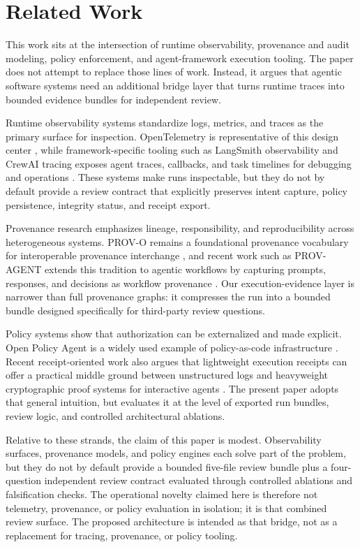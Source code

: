 \section{Related Work}
\label{sec:related-work}

This work sits at the intersection of runtime observability, provenance and audit modeling, policy enforcement, and agent-framework execution tooling. The paper does not attempt to replace those lines of work. Instead, it argues that agentic software systems need an additional bridge layer that turns runtime traces into bounded evidence bundles for independent review.

Runtime observability systems standardize logs, metrics, and traces as the primary surface for inspection. OpenTelemetry is representative of this design center \cite{opentelemetry}, while framework-specific tooling such as LangSmith observability and CrewAI tracing exposes agent traces, callbacks, and task timelines for debugging and operations \cite{langsmith-observability,crewai-tracing}. These systems make runs inspectable, but they do not by default provide a review contract that explicitly preserves intent capture, policy persistence, integrity status, and receipt export.

Provenance research emphasizes lineage, responsibility, and reproducibility across heterogeneous systems. PROV-O remains a foundational provenance vocabulary for interoperable provenance interchange \cite{prov-o}, and recent work such as PROV-AGENT extends this tradition to agentic workflows by capturing prompts, responses, and decisions as workflow provenance \cite{prov-agent}. Our execution-evidence layer is narrower than full provenance graphs: it compresses the run into a bounded bundle designed specifically for third-party review questions.

Policy systems show that authorization can be externalized and made explicit. Open Policy Agent is a widely used example of policy-as-code infrastructure \cite{opa}. Recent receipt-oriented work also argues that lightweight execution receipts can offer a practical middle ground between unstructured logs and heavyweight cryptographic proof systems for interactive agents \cite{tool-receipts}. The present paper adopts that general intuition, but evaluates it at the level of exported run bundles, review logic, and controlled architectural ablations.

Relative to these strands, the claim of this paper is modest. Observability surfaces, provenance models, and policy engines each solve part of the problem, but they do not by default provide a bounded five-file review bundle plus a four-question independent review contract evaluated through controlled ablations and falsification checks. The operational novelty claimed here is therefore not telemetry, provenance, or policy evaluation in isolation; it is that combined review surface. The proposed architecture is intended as that bridge, not as a replacement for tracing, provenance, or policy tooling.
